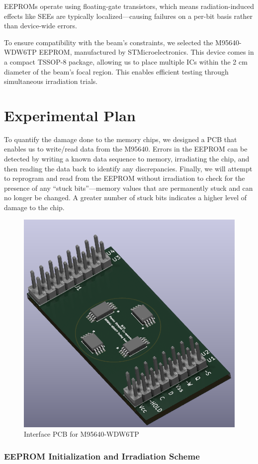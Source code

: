 \documentclass{article}
\begin{document}
EEPROMs operate using floating-gate transistors, which means radiation-induced effects like SEEs are typically localized—causing failures on a per-bit basis rather than device-wide errors.

To ensure compatibility with the beam's constraints, we selected the M95640-WDW6TP EEPROM, manufactured by STMicroelectronics. This device comes in a compact TSSOP-8 package, allowing us to place multiple ICs within the 2 cm diameter of the beam's focal region.
This enables efficient testing through simultaneous irradiation trials.

\vspace{-3em}

\part{Experimental Plan}
To quantify the damage done to the memory chips, we designed a PCB that enables us to write/read data from the M95640. 
Errors in the EEPROM can be detected by writing a known data sequence to memory, irradiating the chip, and then 
reading the data back to identify any discrepancies. Finally, we will attempt to reprogram and read from the EEPROM without
irradiation to check for the presence of any “stuck bits”---memory values that are permanently stuck and can no longer be 
changed. A greater number of stuck bits indicates a higher level of damage to the chip.

\begin{figure}[H]
    \centering
    \includegraphics[width=0.6\linewidth]{./PCB.png}
    \caption{Interface PCB for M95640-WDW6TP}
    \label{fig:enter-label}
\end{figure}


\section*{EEPROM Initialization and Irradiation Scheme}
\end{document}
